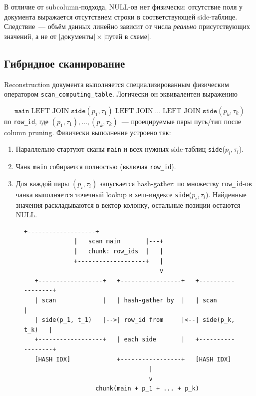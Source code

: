 \documentclass[conference,a4paper,10pt]{IEEEtran}
\begin{document}
В отличие от subcolumn-подхода, NULL-ов нет физически: отсутствие
поля у документа выражается отсутствием строки в соответствующей
side-таблице. Следствие~--- объём данных линейно зависит от числа
\emph{реально} присутствующих значений, а не от
$|\text{документы}| \times |\text{путей в схеме}|$.

\subsection{Гибридное сканирование}
\label{sec:scan}

Reconstruction документа выполняется специализированным физическим
оператором \texttt{scan\_computing\_table}. Логически он
эквивалентен выражению

\[
\texttt{main} \;\text{LEFT JOIN}\; \texttt{side}(p_1,\tau_1)
\;\text{LEFT JOIN}\;\dots\;\text{LEFT JOIN}\;
\texttt{side}(p_k,\tau_k)
\]
по \texttt{row\_id}, где $(p_1,\tau_1),\dots,(p_k,\tau_k)$~---
проецируемые пары путь/тип после column pruning. Физически
выполнение устроено так:

\begin{enumerate}
  \item Параллельно стартуют сканы \texttt{main} и всех нужных
        side-таблиц \texttt{side}($p_i$,\,$\tau_i$).
  \item Чанк \texttt{main} собирается полностью (включая
        \texttt{row\_id}).
  \item Для каждой пары $(p_i,\tau_i)$ запускается hash-gather: по
        множеству \texttt{row\_id}-ов чанка выполняется точечный
        lookup в хеш-индексе \texttt{side}($p_i$,\,$\tau_i$).
        Найденные значения раскладываются в вектор-колонку,
        остальные позиции остаются NULL.
\end{enumerate}

\begin{figure}[h]
\centering
\begin{lstlisting}[caption={Схема исполнения
\texttt{scan\_computing\_table}.},label={fig:scan}]
              +-------------------+
              |   scan main       |---+
              |   chunk: row_ids  |   |
              +-------------------+   |
                                      v
   +------------------+   +-----------------+   +------------------+
   | scan             |   | hash-gather by  |   | scan             |
   | side(p_1, t_1)   |-->| row_id from     |<--| side(p_k, t_k)   |
   +------------------+   | each side       |   +------------------+
   [HASH IDX]             +-----------------+   [HASH IDX]
                                   |
                                   v
                    chunk(main + p_1 + ... + p_k)
\end{lstlisting}
\end{figure}
\end{document}
